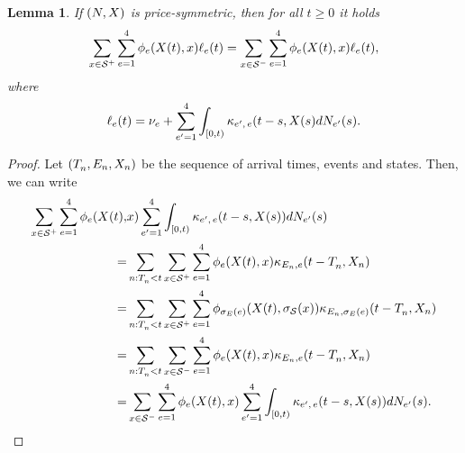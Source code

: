 \documentclass[10pt, article,table]{article}
\newtheorem{lemma}[thm]{Lemma}
\begin{document}
\begin{lemma}\label{lemma.price-simmetry}
 If $\sdHawkesPair$ is price-symmetric, then for all $t\geq 0$ it holds
 \begin{equation*}
  \sum_{x\in\inflationarySpace}\sum_{e=1}^{4}
  \transProb_{e}(\stateVariable(t),x)\ell_{e}(t)
  =
  \sum_{x\in\deflationarySpace}\sum_{e=1}^{4}
  \transProb_{e}(\stateVariable(t),x)\ell_{e}(t),
 \end{equation*}
where
\begin{equation*}
 \ell_{e}(t) = \baseRate_{e}
 +
 \sum_{\eone=1}^{4}\int_{[0,t)} \hawkesKernel\subscriptee(t-s,\stateVariable(s)d\countingProc[\eone](s).
\end{equation*}
\end{lemma}
\begin{proof}
 Let $(\arrivalTimes[]_n,\event[n], \stateVariable_n)$ be the sequence of arrival times, events and states. Then, we can write
 \begin{equation*}
  \begin{split}
   \sum_{x\in\inflationarySpace}\sum_{e=1}^{4}
   \transProb_{e}(\stateVariable(t),& x)
   \sum_{\eone=1}^{4}\int_{[0,t)}\hawkesKernel\subscriptee(t-s,\stateVariable(s))d\countingProc[\eone](s)
   \\
   =&
   \sum_{n:\arrivalTimes[]_n <t}
   \sum_{x\in\inflationarySpace}\sum_{e=1}^{4}
   \transProb_{e}(\stateVariable(t),x)
   \hawkesKernel_{\event[n],e}(t-\arrivalTimes[]_n,\stateVariable_n)
   \\
   =&
   \sum_{n:\arrivalTimes[]_n <t}
   \sum_{x\in\inflationarySpace}\sum_{e=1}^{4}
   \transProb_{\sigma_{E}(e)}(\stateVariable(t),\sigma_{\stateSpace}(x))
   \hawkesKernel_{\event[n],\sigma_{E}(e)}(t-\arrivalTimes[]_n,\stateVariable_n)
   \\
   =&
   \sum_{n:\arrivalTimes[]_n <t}
   \sum_{x\in\deflationarySpace}\sum_{e=1}^{4}
   \transProb_{e}(\stateVariable(t),x)
   \hawkesKernel_{\event[n],e}(t-\arrivalTimes[]_n,\stateVariable_n)
   \\   
   =&
   \sum_{x\in\deflationarySpace}\sum_{e=1}^{4}
   \transProb_{e}(\stateVariable(t), x)
   \sum_{\eone=1}^{4}\int_{[0,t)}\hawkesKernel\subscriptee(t-s,\stateVariable(s))d\countingProc[\eone](s).
   \end{split}
 \end{equation*}
\end{proof}
\end{document}

